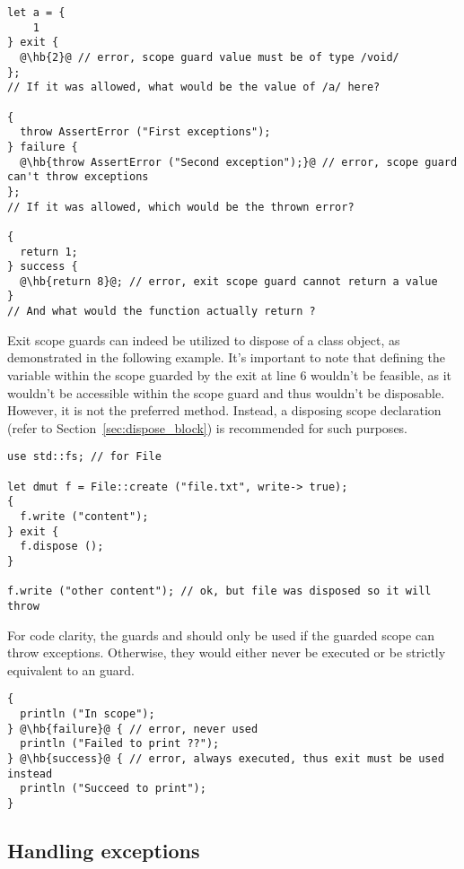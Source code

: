 \begin{lstlisting}[style=coloredverbatim, escapechar=@]
let a = {
    1
} exit {
  @\hb{2}@ // error, scope guard value must be of type /void/
};
// If it was allowed, what would be the value of /a/ here?

{
  throw AssertError ("First exceptions");
} failure {
  @\hb{throw AssertError ("Second exception");}@ // error, scope guard can't throw exceptions
};
// If it was allowed, which would be the thrown error?

{
  return 1;
} success {
  @\hb{return 8}@; // error, exit scope guard cannot return a value
}
// And what would the function actually return ?
\end{lstlisting}

Exit scope guards can indeed be utilized to dispose of a class object, as
demonstrated in the following example. It's important to note that defining the
variable  within the scope guarded by the exit at line 6 wouldn't be
feasible, as it wouldn't be accessible within the scope guard and thus wouldn't
be disposable. However, it is not the preferred method. Instead, a disposing
scope declaration (refer to Section~\ref{sec:dispose_block}) is recommended for
such purposes.

\begin{lstlisting}[style=coloredverbatim]
use std::fs; // for File

let dmut f = File::create ("file.txt", write-> true);
{
  f.write ("content");
} exit {
  f.dispose ();
}

f.write ("other content"); // ok, but file was disposed so it will throw
\end{lstlisting}

For code clarity, the guards  and  should only be
used if the guarded scope can throw exceptions. Otherwise, they would either
never be executed or be strictly equivalent to an  guard.

\begin{lstlisting}[style=coloredverbatim, escapechar=@]
{
  println ("In scope");
} @\hb{failure}@ { // error, never used
  println ("Failed to print ??");
} @\hb{success}@ { // error, always executed, thus exit must be used instead
  println ("Succeed to print");
}
\end{lstlisting}

\subsection{Handling exceptions}
\label{sec:catching_errors}



